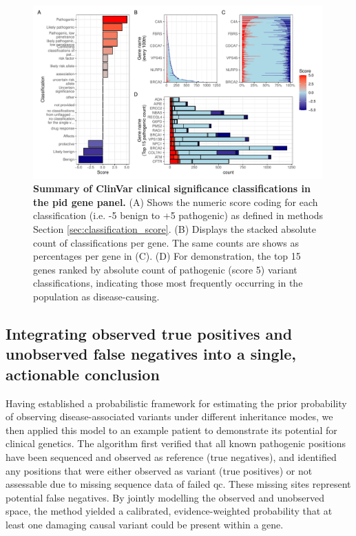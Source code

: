 \begin{figure}[ht]
  \centering
  \includegraphics[width=0.99\textwidth]{../images/p_varRisEst_summary_scores.pdf}
  \caption{\textbf{Summary of ClinVar clinical significance classifications in the \ac{pid} gene panel.} (A) Shows the numeric score coding for each classification (i.e. -5 benign to +5 pathogenic) as defined in methods Section \ref{sec:classification_score}. (B) Displays the stacked absolute count of classifications per gene. The same counts are shows as percentages per gene in (C). (D) For demonstration, the top 15 genes ranked by absolute count of pathogenic (score 5) variant classifications, indicating those most frequently occurring in the population as disease-causing.
  }
  \label{fig:p_varRisEst_summary_scores}
\end{figure} 
 
\subsection{Integrating observed true positives and unobserved false negatives into a single, actionable conclusion}
\label{sec:intregrate_tp_fn}

Having established a probabilistic framework for estimating the prior probability of observing disease-associated variants under different inheritance modes, we then applied this model to an example patient to demonstrate its potential for clinical genetics.
The algorithm first verified that all known pathogenic positions have been sequenced and observed as reference (true negatives), and identified any positions that were either observed as variant (true positives) or not assessable due to missing sequence data of failed \ac{qc}.
These missing sites represent potential false negatives. 
By jointly modelling the observed and unobserved space, the method yielded a calibrated, evidence-weighted probability that at least one damaging causal variant could be present within a gene.

